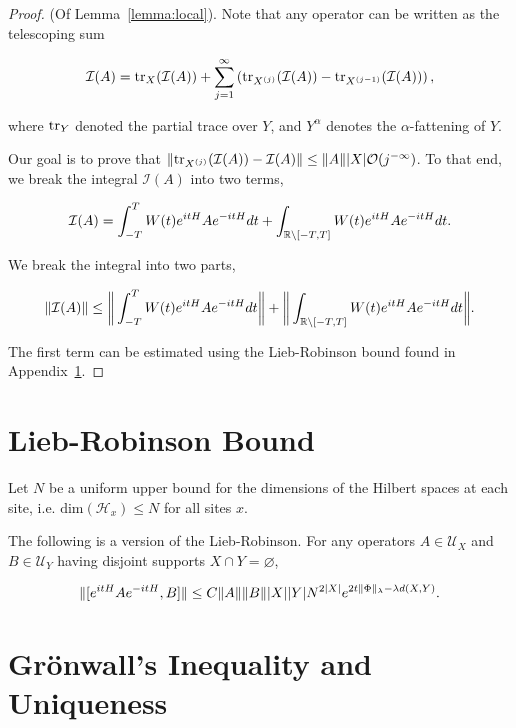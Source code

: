 \documentclass[12pt, letterpaper]{article}
\begin{document}
\begin{proof}

(Of Lemma~\ref{lemma:local}). Note that any operator can be written as the telescoping sum

\[\mathcal{I}(A) = \text{tr}_X(\mathcal{I}(A)) + \sum_{j=1}^\infty \left(\text{tr}_{X^{(j)}}(\mathcal{I}(A)) - \text{tr}_{X^{(j-1)}}(\mathcal{I}(A))\right),\] 

where $\text{tr}_Y$ denoted the partial trace over $Y$, and $Y^\alpha$ denotes the $\alpha$-fattening of $Y$. 

Our goal is to prove that $\lVert \text{tr}_{X^{(j)}}(\mathcal{I}(A)) - \mathcal{I}(A) \rVert \leq \lVert A \rVert |X| \mathcal{O}(j^{-\infty})$. To that end, we break the integral $\mathcal{I}(A)$ into two terms,

\[\mathcal{I}(A) = \int_{-T}^T W(t) e^{itH}Ae^{-itH}dt + \int_{\mathbb{R}\setminus [-T,T]} W(t) e^{itH}Ae^{-itH}dt.\]

We break the integral into two parts,

\[\lVert \mathcal{I}(A) \rVert \leq \bigg\lVert\int_{-T}^T W(t) e^{itH}Ae^{-itH}dt \bigg\rVert + \bigg\lVert \int_{\mathbb{R}\setminus [-T,T]} W(t) e^{itH}Ae^{-itH}dt\bigg\rVert.\]

The first term can be estimated using the Lieb-Robinson bound found in Appendix~\ref{sec:L-R}.

\end{proof}

\section{Lieb-Robinson Bound}
\label{sec:L-R}

Let $N$ be a uniform upper bound for the dimensions of the Hilbert spaces at each site, i.e. $\text{dim}(\mathcal{H}_x) \leq N$ for all sites $x$.

The following is a version of the Lieb-Robinson. For any operators $A \in \mathcal{U}_X$ and $B \in \mathcal{U}_Y$ having disjoint supports $X\cap Y = \varnothing$, 

\[\lVert  [e^{itH}Ae^{-itH}, B]  \rVert \leq  C \lVert A \rVert\lVert B \rVert |X| |Y| N^{2|X|} e^{2t\lVert \Phi \rVert_\lambda - \lambda d(X, Y)}.\]

\section{Gr\"{o}nwall's Inequality and Uniqueness}
\end{document}
